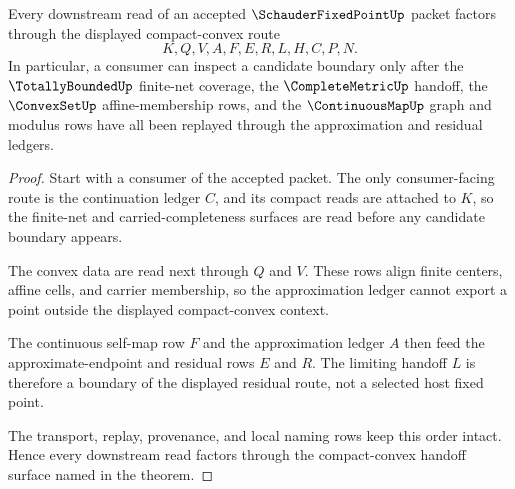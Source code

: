 \begin{theorem}
\label{thm:schauder-fixed-point-compact-convex-handoff}
Every downstream read of an accepted $\SchauderFixedPointUp$ packet factors through the displayed compact-convex route
$$
K,Q,V,A,F,E,R,L,H,C,P,N .
$$
In particular, a consumer can inspect a candidate boundary only after the $\TotallyBoundedUp$ finite-net coverage, the $\CompleteMetricUp$ handoff, the $\ConvexSetUp$ affine-membership rows, and the $\ContinuousMapUp$ graph and modulus rows have all been replayed through the approximation and residual ledgers.
\end{theorem}
\begin{proof}
Start with a consumer of the accepted packet. The only consumer-facing route is
the continuation ledger $C$, and its compact reads are attached to $K$, so the
finite-net and carried-completeness surfaces are read before any candidate
boundary appears.

The convex data are read next through $Q$ and $V$. These rows align finite
centers, affine cells, and carrier membership, so the approximation ledger
cannot export a point outside the displayed compact-convex context.

The continuous self-map row $F$ and the approximation ledger $A$ then feed the
approximate-endpoint and residual rows $E$ and $R$. The limiting handoff $L$ is
therefore a boundary of the displayed residual route, not a selected host fixed
point.

The transport, replay, provenance, and local naming rows keep this order intact.
Hence every downstream read factors through the compact-convex handoff surface
named in the theorem.
\end{proof}


